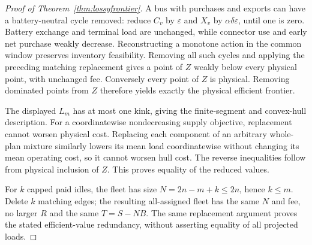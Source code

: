 {\begin{proof}[Proof of Theorem~\ref{thm:lossyfrontier}]
A bus with purchases and exports can have a battery-neutral cycle
removed: reduce $C_v$ by $\varepsilon$ and $X_v$ by
$\alpha\delta\varepsilon$, until one is zero. Battery exchange and
terminal load are unchanged, while connector use and early net purchase
weakly decrease. Reconstructing a monotone action in the common window
preserves inventory feasibility. Removing all such cycles and applying
the preceding matching replacement gives a point of $Z$ weakly below
every physical point, with unchanged fee. Conversely every point of $Z$
is physical. Removing dominated points from $Z$ therefore yields exactly
the physical efficient frontier.

The displayed $L_m$ has at most one kink, giving the finite-segment and
convex-hull description. For a coordinatewise nondecreasing supply
objective, replacement cannot worsen physical cost. Replacing each
component of an arbitrary whole-plan mixture similarly lowers its mean
load coordinatewise without changing its mean operating cost, so it
cannot worsen hull cost. The reverse inequalities follow from physical
inclusion of $Z$. This proves equality of the reduced values.

For $k$ capped paid idles, the fleet has size $N=2n-m+k\le2n$, hence
$k\le m$. Delete $k$ matching edges; the resulting all-assigned fleet
has the same $N$ and fee, no larger $R$ and the same $T=S-NB$.
The same replacement argument proves the stated efficient-value
redundancy, without asserting equality of all projected loads.
\end{proof}
}
